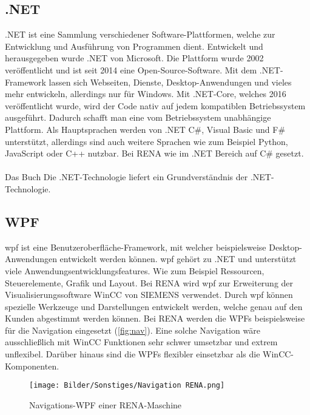 \subsection{.NET}
.NET \cite{microsoft.net} ist eine Sammlung verschiedener Software-Plattformen, welche zur Entwicklung und Ausführung von Programmen dient. Entwickelt und herausgegeben wurde .NET von Microsoft. Die Plattform wurde 2002 veröffentlicht und ist seit 2014 eine Open-Source-Software. Mit dem .NET-Framework lassen sich Webseiten, Dienste, Desktop-Anwendungen und vieles mehr entwickeln, allerdings nur für Windows. Mit .NET-Core, welches 2016 veröffentlicht wurde, wird der Code nativ auf jedem kompatiblen Betriebssystem ausgeführt. Dadurch schafft man eine vom Betriebssystem unabhängige Plattform. Als Hauptsprachen werden von .NET C\#, Visual Basic und F\# unterstützt, allerdings sind auch weitere Sprachen wie zum Beispiel Python, JavaScript oder C++ nutzbar. Bei RENA wie im .NET Bereich auf C\# gesetzt.
\ \\
Das Buch \glqq Die .NET-Technologie\grqq{} \cite{.Net-Buch} liefert ein Grundverständnis der .NET-Technologie.

\subsection{WPF}
\ac{wpf} \cite{wpf} ist eine Benutzeroberfläche-Framework, mit welcher beispielsweise Desktop-Anwendungen entwickelt werden können. \ac{wpf} gehört zu .NET und unterstützt viele Anwendungsentwicklungsfeatures. Wie zum Beispiel Ressourcen, Steuerelemente, Grafik und Layout. Bei RENA wird \ac{wpf} zur Erweiterung der Visualisierungssoftware WinCC von SIEMENS verwendet. Durch \ac{wpf} können spezielle Werkzeuge und Darstellungen entwickelt werden, welche genau auf den Kunden abgestimmt werden können. Bei RENA werden die WPFs beispielsweise für die Navigation eingesetzt (\autoref{fig:nav}). Eine solche Navigation wäre ausschließlich mit WinCC Funktionen sehr schwer umsetzbar und extrem unflexibel. Darüber hinaus sind die WPFs flexibler einsetzbar als die WinCC-Komponenten.

\begin{figure}
\centering
 \texttt{[image: Bilder/Sonstiges/Navigation RENA.png]}
 \caption[Navigations-WPF einer RENA-Maschine]{Navigations-WPF einer RENA-Maschine}
 \label{fig:nav}
\end{figure}

